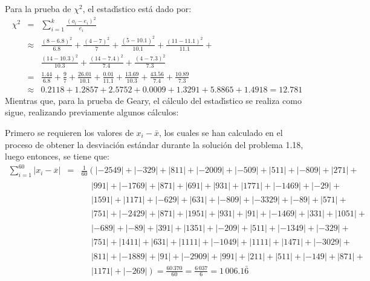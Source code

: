 \begin{solucion}
 \begin{estadistico}
  Para la prueba de $\chi^2$, el estad\'{\i}stico est\'a dado por:
  \begin{eqnarray*}
   \chi^2 & = & \sum_{i=1}^{k} \frac{\left( o_i - e_i \right)^2}{e_i} \\
   & \approx & \frac{(8-6.8)^2}{6.8} + \frac{(4-7)^2}{7} +
   \frac{(5-10.1)^2}{10.1} + \frac{(11-11.1)^2}{11.1} + \\
   & & 
   \frac{(14-10.3)^2}{10.3} + \frac{(14-7.4)^2}{7.4} + \frac{(4-7.3)^2}{7.3} \\
   & = & \frac{1.44}{6.8} + \frac{9}{7} + \frac{26.01}{10.1} +
   \frac{0.01}{11.1}+\frac{13.69}{10.3}+\frac{43.56}{7.4}+\frac{10.89}{7.3} \\
   & \approx & 0.2118 + 1.2857 + 2.5752 + 0.0009 + 1.3291 + 5.8865 + 1.4918
   = 12.781
  \end{eqnarray*}
  Mientras que, para la prueba de Geary, el c\'alculo del estad\'{\i}stico
  se realiza como sigue, realizando previamente algunos c\'alculos:
  \par 
  Primero se requieren los valores de $x_i - \bar{x}$, los cuales se
  han calculado en el proceso de obtener la desviaci\'on est\'andar
  durante la soluci\'on del problema 1.18, luego entonces, se tiene que:
  \begin{eqnarray*}
   \sum_{i=1}^{60} \left| x_i - \overline{x} \right| & = &
   \frac{1}{60}\left( |-2549| + |-329| + |811| + |-2009| + |-509| + |511| +
   |-809| + |271| + \right. \\
   & & \phantom{\frac{1}{60}(} |991| + |-1769| + |871| + |691| + |931| +
   |1771| + |-1469| + |-29| + \\
   & & \phantom{\frac{1}{60}(} |1591| + |1171| + |-629| + |631| + |-809| +
   |-3329| + |-89| + |571| + \\
   & & \phantom{\frac{1}{60}(} |751| + |-2429| +  |871| + |1951| + |931| + 
   |91| + |-1469| + |331| +  |1051| + \\
   & & \phantom{\frac{1}{60}(} |-689| + |-89| + |391| + |1351| + 
   |-209| + |511| + |-1349| + |-329| + \\
   & & \phantom{\frac{1}{60}(} |751| + |1411| + |631| + |1111| + |-1049| + 
   |1111| + |1471| + |-3029| + \\
   & & \phantom{\frac{1}{60}(} |811| + |-1889| + |91| + |-2909| + |991| + 
   |211| + |511| + |-149| + |871| + \\
   & & \phantom{\frac{1}{60}(} \left. |1171| + |-269| \right)
   = \frac{60\,370}{60} = \frac{6\,037}{6} = 1\,006.1\bar{6}

\end{eqnarray*}
\end{estadistico}
\end{solucion}
